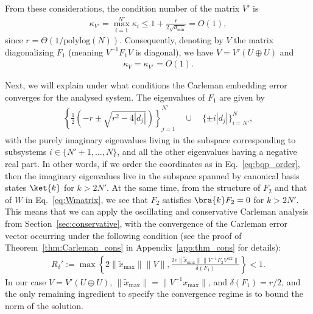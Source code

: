 \documentclass[superscriptaddress,onecolumn,nofootinbib,longbibliography,a4paper,accepted=2026-09-29]{quantumarticle}
\theoremstyle{plain}
\theoremstyle{definition}
\numberwithin{thm}{section}
\numberwithin{assumption}{section}
\numberwithin{lemma}{section}
\numberwithin{prop}{section}
\numberwithin{cor}{section}
\numberwithin{definition}{section}
\numberwithin{rmk}{section}
\numberwithin{equation}{section}
\begin{document}
From these considerations, the condition number of the matrix $V'$ is
\begin{align}
    \kappa_{V'} = \max_{i=1}^{N'} \kappa_i \leq 1+ \frac{r}{2 {\sqrt{d_{\mathrm{min}}}}} = O(1), 
\end{align}
since $r = \Theta(1/\mathrm{polylog}(N))$. Consequently, denoting by $V$ the matrix diagonalizing $F_1$ (meaning $V^{-1} F_1 V$ is diagonal), we have $V= V' (U \oplus U)$ and 
\begin{align}
    \kappa_V = \kappa_{V'} = O(1).
\end{align}

Next, we will explain under what conditions the Carleman embedding error converges for the analysed system. The eigenvalues of $F_1$ are given by
\begin{align}
    \label{eq:bqp_convergence}
   \left\{ \frac{1}{2} (- r \pm \sqrt{r^2 - 4 |d_j|}) \right\}_{j=1}^{N'} \quad \cup \quad \{\pm i |d_j|\}_{i=N'}^N,
\end{align}
with the purely imaginary eigenvalues living in the subspace corresponding to subsystems $i\in\{N'+1, \dots, N\}$, and all the other eigenvalues having a negative real part. In other words, if we order the coordinates as in Eq.~\eqref{eq:bqp_order}, then the imaginary eigenvalues live in the subspace spanned by canonical basis states $\ket{k}$ for $k>2N'$. At the same time, from the structure of $F_2$ and that of $W$ in Eq.~\eqref{eq:Wmatrix}, we see that $F_2$ satisfies $\bra{k} F_2 = 0$ for $k>2N'$. This means that we can apply the oscillating and conservative Carleman analysis from Section~\ref{sec:conservative}, with the convergence of the Carleman error vector occurring under the following condition (see the proof of Theorem~\ref{thm:Carleman_cons} in Appendix~\ref{app:thm_cons} for details):
\begin{align}
R_\delta':=\max \left\{ 2 \|\tilde{x}_{\mathrm{max}}\| \| V\| , \frac{2e\|\tilde{x}_{\mathrm{max}}\|\|V^{-1}\bar{F}_2V^{\otimes 2}\|}{\delta(F_1)} \right\} < 1.
\end{align}
In our case $V = V' (U \oplus U)$, $\|\tilde{x}_{\mathrm{max}}\| = \|V^{-1} x_{\mathrm{max}}\|$, and $\delta(F_1) = r/2$, and the only remaining ingredient to specify the convergence regime is to bound the norm of the solution.
\end{document}

